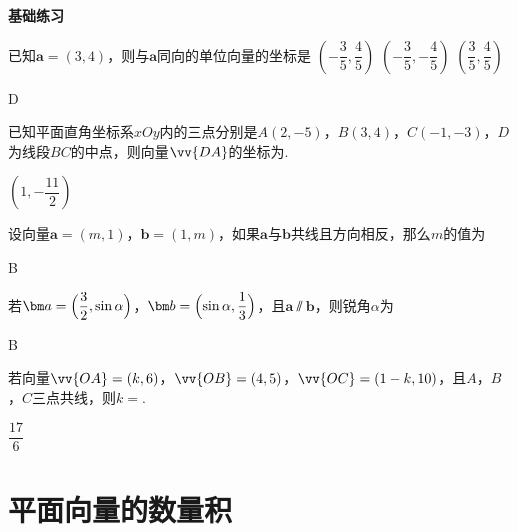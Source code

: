\begin{Theorem}[平面向量基本定理]
\begin{exercise}{{\textbf{基础练习}}}
\begin{answer}
      \end{answer}
    \item%
      已知$\bm a=(3,4)$，则与$\bm a$同向的单位向量的坐标是\xz
       {$(-\dfrac{3}5,\dfrac{4}5)$}
       {$(-\dfrac{3}5,-\dfrac{4}5)$}
       {$(\dfrac{3}5,\dfrac{4}5)$}
      \begin{answer}
        D
      \end{answer}
    \item%
      已知平面直角坐标系$xOy$内的三点分别是$A(2,-5)$，$B(3,4)$，$C(-1,-3)$，$D$为线段$BC$的中点，则向量$\vv{DA}$的坐标为\tk.
      \begin{answer}
        $(1,-\dfrac{11}2)$
      \end{answer}
    \item%
      设向量$\bm a=(m,1)$，$\bm b=(1,m)$，如果$\bm a$与$\bm b$共线且方向相反，那么$m$的值为\xz
      \begin{answer}
        B
      \end{answer}
    \item%
      若$\bm a=\Bigl(\dfrac{3}2,\sin\alpha\Bigr)$，$\bm b=\Bigl(\sin\alpha,\dfrac{1}3\Bigr)$，且$\bm a\varparallel \bm b$，则锐角$\alpha$为\xz
      \xx{30\degree}{45\degree}{60\degree}{75\degree}
      \begin{answer}
        B
      \end{answer}
    \item%
      若向量$\vv{OA}=(k,6)$，$\vv{OB}=(4,5)$，$\vv{OC}=(1-k,10)$，且$A$，$B$，$C$三点共线，则$k=$\tk.
      \begin{answer}
        $\dfrac{17}6$
      \end{answer}
  \end{exercise}
\section{平面向量的数量积}

\end{Theorem}
